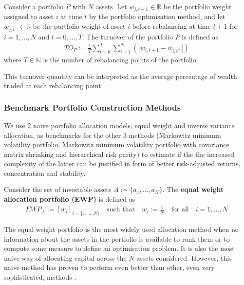         \begin{definition}
            Consider a portfolio $P$ with $N$ assets. Let $w_{j,t+1} \in \mathbb{R}$ be the portfolio weight assigned to asset $i$ at time $t$ by the portfolio optimisation method, and let $w_{j,t^+} \in \mathbb{R}$ be the portfolio weight of asset $i$ before rebalancing at time $t+1$ for $i=1, \dots, N$ and $t=0, \dots, T$. The turnover of the portfolio $P$ is defined as
            \begin{align*}
                TO_P := \frac{1}{T} \sum_{t=0}^T \sum_{i=1}^N \left( \left| w_{i, t+1} - w_{i, t^+} \right| \right)
            \end{align*}
            where $T \in \mathbb{N}$ is the number of rebalancing points of the portfolio.
        \end{definition}
        
        This turnover quantity can be interpreted as the average percentage of wealth traded at each rebalancing point.
        
    \subsubsection{Benchmark Portfolio Construction Methods}
        We use 2 naive portfolio allocation models, equal weight and inverse variance allocation, as benchmarks for the other 3 methods (Markowitz minimum volatility portfolio, Markowitz minimum volatility portfolio with covariance matrix shrinking and hierarchical risk parity) to estimate if the the increased complexity of the latter can be justified in form of better risk-adjusted returns, concentration and stability.
        
        \begin{definition}
            Consider the set of investable assets $A := \{ a_1, \dots, a_N \}$. The \textbf{equal weight allocation portfolio (EWP)} is defined as
            \begin{align*}
                EWP_A := [w_i]_{i=\{1, \dots, N \}} \quad \text{such that} \quad w_i := \frac{1}{N} \quad \text{for all} \quad i = 1, \dots, N
            \end{align*}
        \end{definition}
        
        The equal weight portfolio is the most widely used allocation method when no information about the assets in the portfolio is available to rank them or to compute some measure to define an optimisation problem. It is also the most naive way of allocating capital across the $N$ assets considered. However, this naive method has proven to perform even better than other, even very sophisticated, methods \cite{equalweight}.
        
